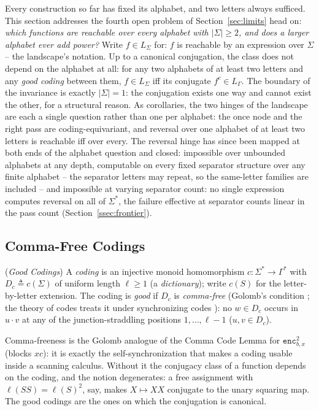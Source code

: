 \documentclass[runningheads,envcountsect]{llncs}
\begin{document}
Every construction so far has fixed its alphabet, and two letters always sufficed. This section addresses the fourth open problem of Section~\ref{sec:limits} head on: \emph{which functions are reachable over every alphabet with $|\Sigma| \geq 2$, and does a larger alphabet ever add power?} Write $f \in L_\Sigma$ for: $f$ is reachable by an expression over $\Sigma$ -- the landscape's notation. Up to a canonical conjugation, the class does not depend on the alphabet at all: for any two alphabets of at least two letters and any \emph{good coding} between them, $f \in L_\Sigma$ iff its conjugate $f^c \in L_\Gamma$. The boundary of the invariance is exactly $|\Sigma| = 1$: the conjugation exists one way and cannot exist the other, for a structural reason. As corollaries, the two hinges of the landscape are each a single question rather than one per alphabet: the once node and the right pass are coding-equivariant, and reversal over one alphabet of at least two letters is reachable iff over every. The reversal hinge has since been mapped at both ends of the alphabet question and closed: impossible over unbounded alphabets at any depth, computable on every fixed separator structure over any finite alphabet -- the separator letters may repeat, so the same-letter families are included -- and impossible at varying separator count: no single expression computes reversal on all of $\Sigma^*$, the failure effective at separator counts linear in the pass count (Section~\ref{ssec:frontier}).

\subsection{Comma-Free Codings}

\begin{definition}
    (\emph{Good Codings})
    \label{def:code}
    A \emph{coding} is an injective monoid homomorphism $c : \Sigma^* \rightarrow \Gamma^*$ with $D_c \triangleq c(\Sigma)$ of uniform length $\ell \geq 1$ (a \emph{dictionary}); write $c(S)$ for the letter-by-letter extension. The coding is \emph{good} if $D_c$ is \emph{comma-free} (Golomb's condition \cite{golomb58}; the theory of codes treats it under synchronizing codes \cite{berstel85,lothaire97}): no $w \in D_c$ occurs in $u \cdot v$ at any of the junction-straddling positions $1, \dots, \ell-1$ ($u, v \in D_c$).
\end{definition}

Comma-freeness is the Golomb analogue of the Comma Code Lemma for $\mathtt{enc}^2_{b,x}$ (blocks $xc$): it is exactly the self-synchronization that makes a coding usable inside a scanning calculus. Without it the conjugacy class of a function depends on the coding, and the notion degenerates: a free assignment with $\ell(SS) = \ell(S)^2$, say, makes $X \mapsto XX$ conjugate to the unary squaring map. The good codings are the ones on which the conjugation is canonical.
\end{document}
